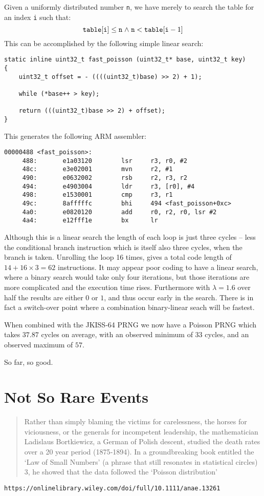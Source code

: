 Given a uniformly distributed number {\tt n}, we have merely to
search the table for an index {\tt i} such that:
\[ \mbox{\tt table}[\mbox{\tt i}] \leq \mbox{\tt n} \mathrel{\wedge}
\mbox{\tt n} < \mbox{\tt table}[\mbox{\tt i}-1] \]
This can be accomplished by the following simple linear search:
\begin{verbatim}
static inline uint32_t fast_poisson (uint32_t* base, uint32_t key)
{
    uint32_t offset = - ((((uint32_t)base) >> 2) + 1);

    while (*base++ > key);

    return (((uint32_t)base >> 2) + offset);
}
\end{verbatim}
This generates the following ARM assembler:
\begin{verbatim}
00000488 <fast_poisson>:
     488:       e1a03120        lsr     r3, r0, #2
     48c:       e3e02001        mvn     r2, #1
     490:       e0632002        rsb     r2, r3, r2
     494:       e4903004        ldr     r3, [r0], #4
     498:       e1530001        cmp     r3, r1
     49c:       8afffffc        bhi     494 <fast_poisson+0xc>
     4a0:       e0820120        add     r0, r2, r0, lsr #2
     4a4:       e12fff1e        bx      lr
\end{verbatim}

Although this is a linear search the length of each loop is just three
cycles -- less the conditional branch instruction which is itself also
three cycles, when the branch is taken. Unrolling the loop 16 times,
gives a total code length of $14+ 16\times 3 = 62$ instructions.  It
may appear poor coding to have a linear search, where a binary search
would take only four iterations, but those iterations are more
complicated and the execution time rises. Furthermore with
$\lambda=1.6$ over half the results are either $0$ or $1$, and thus
occur early in the search. There is in fact a switch-over point where
a combination binary-linear seach will be fastest.

When combined with the JKISS-64 PRNG we now have a Poisson PRNG which
takes $37.87$ cycles on average, with an observed minimum of $33$
cycles, and an observed maximum of $57$.

So far, so good.

\section{Not So Rare Events}

\begin{quotation}
Rather than simply blaming the victims for carelessness, the horses for
viciousness, or the generals for incompetent leadership, the
mathematician Ladislaus Bortkiewicz, a German of Polish descent,
studied the death rates over a 20 year period (1875‐1894). In a
groundbreaking book entitled the ‘Law of Small Numbers’ (a phrase that
still resonates in statistical circles) 3, he showed that the data
followed the ‘Poisson distribution’ 
\end{quotation}
\begin{verbatim}
https://onlinelibrary.wiley.com/doi/full/10.1111/anae.13261
\end{verbatim}


